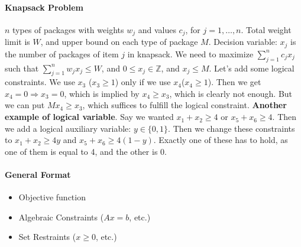 \documentclass[10pt,letter]{article}
\theoremstyle{plain}
\theoremstyle{definition}
\begin{document}
\paragraph{Knapsack Problem}
$n$ types of packages with weights $w_j$ and values $c_j$, for $j=1,\ldots,n$. Total weight limit is $W$, and upper bound on each type of package $M$. Decision variable: $x_j$ is the number of packages of item $j$ in knapsack. We need to maximize $\sum_{j=1}^n c_jx_j$ such that $\sum_{j=1}^n w_jx_j\leq W$, and $0\leq x_j\in\mathbb{Z}$, and $x_j\leq M$. Let's add some logical constraints. We use $x_3$ ($x_3\geq1$) only if we use $x_4$($x_4\geq1$). Then we get $x_4=0\Rightarrow x_3=0$, which is implied by $x_4\geq x_3$, which is clearly not enough. But we can put $Mx_4\geq x_3$, which suffices to fulfill the logical constraint. \textbf{Another example of logical variable}. Say we wanted $x_1+x_2\geq4$ or $x_5+x_6\geq4$. Then we add a logical auxiliary variable: $y\in\{0,1\}$. Then we change these constraints to $x_1+x_2\geq4y$ and $x_5+x_6\geq4(1-y)$. Exactly one of these has to hold, as one of them is equal to 4, and the other is 0. 

\paragraph{General Format}
\begin{itemize}
    \item Objective function
    \item Algebraic Constraints ($Ax=b$, etc.)
    \item Set Restraints ($x\geq0$, etc.)
\end{itemize}
\end{document}
